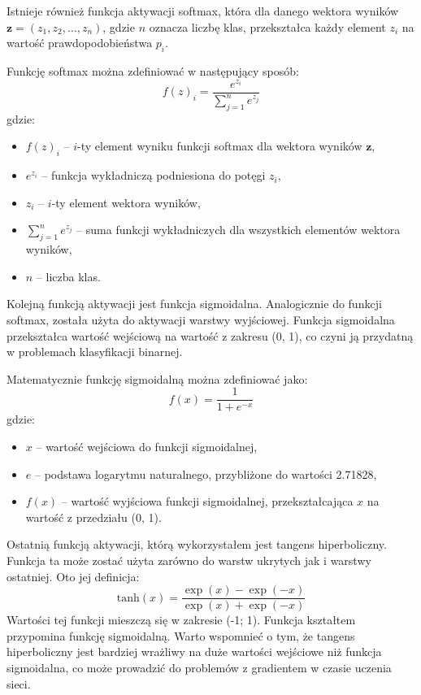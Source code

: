 \documentclass{article}
\begin{document}
Istnieje również funkcja aktywacji softmax, która dla danego wektora wyników \( \mathbf{z} = (z_1, z_2, \ldots, z_n) \), gdzie \( n \) oznacza liczbę klas, przekształca każdy element \( z_i \) na wartość prawdopodobieństwa \( p_i \).

Funkcję softmax można zdefiniować w następujący sposób:
\[
    f(z)_i = \frac{e^{z_i}}{\sum_{j=1}^{n} e^{z_j}}
\]
gdzie:
\begin{itemize}
    \item \(f(z)_i\) -- \(i\)-ty element wyniku funkcji softmax dla wektora wyników \(\mathbf{z}\),
    \item \(e^{z_i}\) -- funkcja wykładniczą podniesiona do potęgi \(z_i\),
    \item \(z_i\) -- \(i\)-ty element wektora wyników,
    \item \(\sum_{j=1}^{n} e^{z_j}\) -- suma funkcji wykładniczych dla wszystkich elementów wektora wyników,
    \item \(n\) -- liczba klas.
\end{itemize}

Kolejną funkcją aktywacji jest funkcja sigmoidalna.
Analogicznie do funkcji softmax, została użyta do aktywacji warstwy wyjściowej.
Funkcja sigmoidalna przekształca wartość wejściową na wartość z zakresu (0, 1), co czyni ją przydatną w problemach klasyfikacji binarnej.

Matematycznie funkcję sigmoidalną można zdefiniować jako:
\[
    f(x) = \frac{1}{1 + e^{-x}}
\]
gdzie:
\begin{itemize}
    \item \(x\) -- wartość wejściowa do funkcji sigmoidalnej,
    \item \(e\) --  podstawa logarytmu naturalnego, przybliżone do wartości 2.71828,
    \item \(f(x)\) -- wartość wyjściowa funkcji sigmoidalnej, przekształcająca \(x\) na wartość z przedziału (0, 1).
\end{itemize}

Ostatnią funkcją aktywacji, którą wykorzystałem jest tangens hiperboliczny.
Funkcja ta może zostać użyta zarówno do warstw ukrytych jak i warstwy ostatniej.
Oto jej definicja:
\[\text{tanh}(x) = \frac{{\exp(x) - \exp(-x)}}{{\exp(x) + \exp(-x)}}\]
Wartości tej funkcji mieszczą się w zakresie (-1; 1).
Funkcja kształtem przypomina funkcję sigmoidalną.
Warto wspomnieć o tym, że tangens hiperboliczny jest bardziej wrażliwy na duże wartości wejściowe niż funkcja sigmoidalna, co może prowadzić do problemów z gradientem w czasie uczenia sieci.
\end{document}
